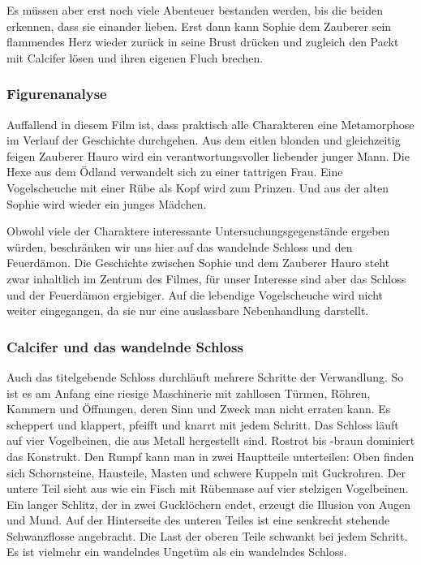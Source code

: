 Es müssen aber erst noch viele Abenteuer bestanden werden, bis die beiden erkennen, dass sie einander lieben. Erst dann kann Sophie dem Zauberer sein flammendes Herz wieder zurück in seine Brust drücken und zugleich den Packt mit Calcifer lösen und ihren eigenen Fluch brechen. 

\subsubsection{Figurenanalyse} 
Auffallend in diesem Film ist, dass praktisch alle Charakteren eine Metamorphose im Verlauf der Geschichte durchgehen. Aus dem eitlen blonden und gleichzeitig feigen Zauberer Hauro wird ein verantwortungsvoller liebender junger Mann. Die Hexe aus dem Ödland verwandelt sich zu einer tattrigen Frau. Eine Vogelscheuche mit einer Rübe als Kopf wird zum Prinzen. Und aus der alten Sophie wird wieder ein junges Mädchen.  

Obwohl viele der Charaktere interessante Untersuchungsgegenstände ergeben würden, beschränken wir uns hier auf das wandelnde Schloss und den Feuerdämon. Die Geschichte zwischen Sophie und dem Zauberer Hauro steht zwar inhaltlich im Zentrum des Filmes, für unser Interesse sind aber das Schloss und der Feuerdämon ergiebiger. Auf die lebendige Vogelscheuche wird nicht weiter eingegangen, da sie nur eine auslassbare Nebenhandlung darstellt. 

\subsubsection*{Calcifer und das wandelnde Schloss} 
Auch das titelgebende Schloss durchläuft mehrere Schritte der Verwandlung. So ist es am Anfang eine riesige Maschinerie mit zahllosen Türmen, Röhren, Kammern und Öffnungen, deren Sinn und Zweck man nicht erraten kann. Es scheppert und klappert, pfeifft und knarrt mit jedem Schritt. Das Schloss läuft auf vier Vogelbeinen, die aus Metall hergestellt sind. Rostrot bis -braun dominiert das Konstrukt. Den Rumpf kann man in zwei Hauptteile unterteilen: Oben finden sich Schornsteine, Hausteile, Masten und schwere Kuppeln mit Guckrohren. Der untere Teil sieht aus wie ein Fisch mit Rübennase auf vier stelzigen Vogelbeinen. Ein langer Schlitz, der in zwei Gucklöchern endet, erzeugt die Illusion von Augen und Mund. Auf der Hinterseite des unteren Teiles ist eine senkrecht stehende Schwanzflosse angebracht. Die Last der oberen Teile schwankt bei jedem Schritt. Es ist vielmehr ein wandelndes Ungetüm als ein wandelndes Schloss. 

